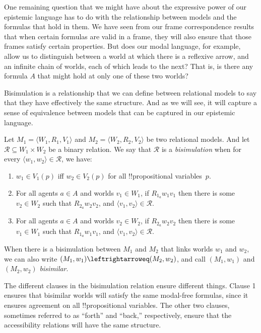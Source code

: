\documentclass[../../../include/open-logic-section]{subfiles}
\begin{document}


One remaining question that we might have about the expressive power
of our epistemic language has to do with the relationship between
models and the formulas that hold in them. We have seen from our frame
correspondence results that when certain formulas are valid in a
frame, they will also ensure that those frames satisfy certain
properties. But does our modal language, for example, allow us to
distinguish between a world at which there is a reflexive arrow, and
an infinite chain of worlds, each of which leads to the next? That is,
is there any formula $A$ that might hold at only one of these two
worlds?

Bisimulation is a relationship that we can define between relational
models to say that they have effectively the same structure. And as we
will see, it will capture a sense of equivalence between models that
can be captured in our epistemic language.

\begin{defn}[Bisimulation]
Let $M_1 = \langle W_1, R_1, V_1 \rangle$ and $M_2 = \langle W_2, R_2, V_2 \rangle$ be two relational models. And let $\mathcal{R} \subseteq W_1 \times W_2$ be a binary relation. We say that $\mathcal{R}$ is a \emph{bisimulation} when for every $\langle w_1, w_2 \rangle \in \mathcal{R}$, we have:

\begin{enumerate}
  \item {$w_1 \in V_1(p)$ iff $w_2 \in V_2(p)$ for all
  !!{propositional variable}s~$p$.}{}
  \item {For all agents $a \in A$ and worlds $v_1 \in W_1$, if
  $R_{1_a} w_1 v_1$ then there is some $v_2 \in W_2$ such that
  $R_{2_a} w_2 v_2$, and $\langle v_1, v_2 \rangle \in
  \mathcal{R}$.}{}
  \item {For all agents $a \in A$ and worlds $v_2 \in W_2$, if
   $R_{2_a} w_2 v_2$ then there is some $v_1 \in W_1$ such that
   $R_{1_a} w_1 v_1$, and $\langle v_1, v_2 \rangle \in
   \mathcal{R}$.}{}
\end{enumerate}

When there is a bisimulation between $M_1$ and $M_2$ that links worlds
$w_1$ and $w_2$, we can also write $(M_1, w_1) \leftrightarroweq (M_2,
w_2)$, and call $(M_1, w_1)$ and $(M_2, w_2)$ \emph{bisimilar}.
\end{defn}

The different clauses in the bisimulation relation ensure different
things. Clause 1 ensures that bisimilar worlds will satisfy the same
modal-free formulas, since it ensures agreement on all
!!{propositional variable}s. The other two clauses, sometimes referred
to as ``forth'' and ``back,'' respectively, ensure that the
accessibility relations will have the same structure.
\end{document}
